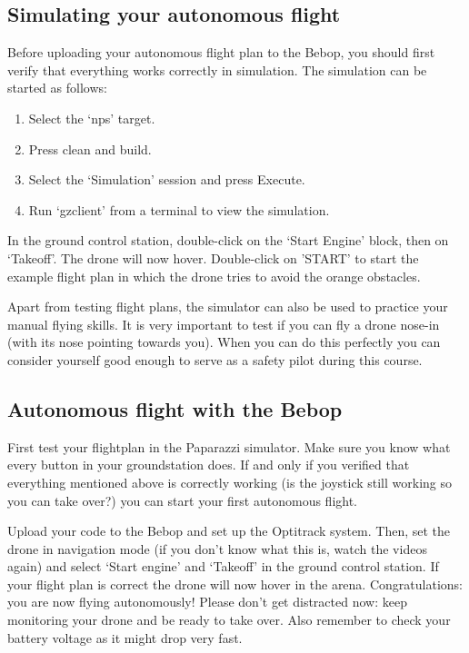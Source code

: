 \documentclass{article}
\begin{document}
\subsection*{Simulating your autonomous flight}
Before uploading your autonomous flight plan to the Bebop, you should first verify that everything works correctly in simulation.
The simulation can be started as follows:
\begin{enumerate}
\item Select the `nps' target.
\item Press clean and build.
\item Select the `Simulation' session and press Execute.
\item Run `gzclient' from a terminal to view the simulation.
\end{enumerate}
In the ground control station, double-click on the `Start Engine' block, then on `Takeoff'. The drone will now hover. Double-click on 'START' to start the example flight plan in which the drone tries to avoid the orange obstacles.

Apart from testing flight plans, the simulator can also be used to practice your manual flying skills. It is very important to test if you can fly a drone nose-in (with its nose pointing towards you). When you can do this perfectly you can consider yourself good enough to serve as a safety pilot during this course. 

\subsection*{Autonomous flight with the Bebop}
First test your flightplan in the Paparazzi simulator. Make sure you know what every button in your groundstation does.
If and only if you verified that everything mentioned above is correctly working (is the joystick still working so you can take over?) you can start your first autonomous flight. 

Upload your code to the Bebop and set up the Optitrack system.
Then, set the drone in navigation mode (if you don't know what this is, watch the videos again) and select `Start engine' and `Takeoff' in the ground control station. If your flight plan is correct the drone will now hover in the arena. Congratulations: you are now flying autonomously! Please don't get distracted now: keep monitoring your drone and be ready to take over. Also remember to check your battery voltage as it might drop very fast. 
\end{document}
